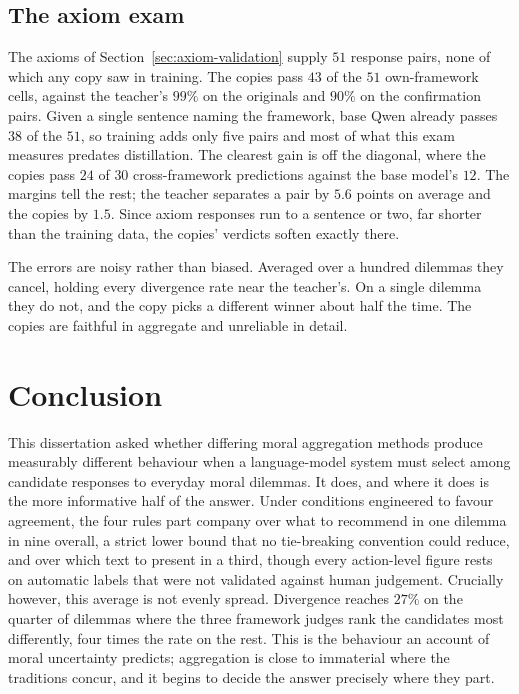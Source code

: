 \documentclass[10pt,twocolumn,a4paper]{article}
\begin{document}
\subsection{The axiom exam}

The axioms of Section~\ref{sec:axiom-validation} supply $51$ response
pairs, none of which any copy saw in training. The copies pass $43$ of
the $51$ own-framework cells, against the teacher's $99\%$ on the
originals and $90\%$ on the confirmation pairs. Given a
single sentence naming the framework, base Qwen already passes $38$ of
the $51$, so training adds only five pairs and most of what this exam
measures predates distillation. The clearest gain is off the diagonal,
where the copies pass $24$ of $30$ cross-framework predictions against
the base model's $12$. The margins tell the rest; the teacher separates a
pair by $5.6$ points on average and the copies by $1.5$. Since
axiom responses run to a sentence or two, far shorter than the training
data, the copies' verdicts soften exactly there.

The errors are noisy rather than biased. Averaged over a hundred
dilemmas they cancel, holding every divergence rate near the teacher's.
On a single dilemma they do not, and the copy picks a different winner
about half the time. The copies are faithful in
aggregate and unreliable in detail.

\section{Conclusion}
\label{sec:conclusion}

This dissertation asked whether differing moral aggregation methods
produce measurably different behaviour when a language-model system
must select among candidate responses to everyday moral dilemmas. It
does, and where it does is the more informative half of the answer.
Under conditions engineered to favour agreement, the four rules part
company over what to recommend in one dilemma in nine overall, a strict
lower bound that no tie-breaking convention could reduce, and over which
text to present in a third, though every action-level figure rests on
automatic labels that were not validated against human judgement.
Crucially however, this average is not evenly spread.
Divergence reaches $27\%$ on the quarter of dilemmas where the three
framework judges rank the candidates most differently, four times the
rate on the rest. This is the behaviour an account of moral uncertainty
predicts; aggregation is close to immaterial where the traditions
concur, and it begins to decide the answer precisely where they part.
\end{document}
